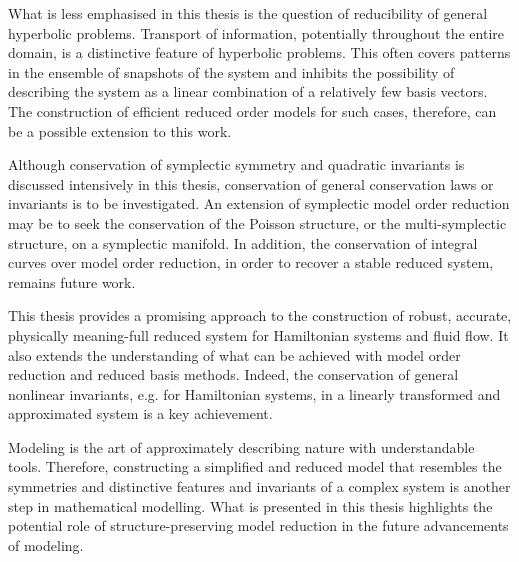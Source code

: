 What is less emphasised in this thesis is the question of reducibility of general hyperbolic problems. Transport of information, potentially throughout the entire domain, is a distinctive feature of hyperbolic problems. This often covers patterns in the ensemble of snapshots of the system and inhibits the possibility of describing the system as a linear combination of a relatively few basis vectors. The construction of efficient reduced order models for such cases, therefore, can be a possible extension to this work.

Although conservation of symplectic symmetry and quadratic invariants is discussed intensively in this thesis, conservation of general conservation laws or invariants is to be investigated. An extension of symplectic model order reduction may be to seek the conservation of the Poisson structure, or the multi-symplectic structure, on a symplectic manifold. In addition, the conservation of integral curves over model order reduction, in order to recover a stable reduced system, remains future work.

This thesis provides a promising approach to the construction of robust, accurate, physically meaning-full reduced system for Hamiltonian systems and fluid flow. It also extends the understanding of what can be achieved with model order reduction and reduced basis methods. Indeed, the conservation of general nonlinear invariants, e.g. for Hamiltonian systems, in a linearly transformed and approximated system is a key achievement. 

Modeling is the art of approximately describing nature with understandable tools. Therefore, constructing a simplified and reduced model that resembles the symmetries and distinctive features and invariants of a complex system is another step in mathematical modelling. What is presented in this thesis highlights the potential role of structure-preserving model reduction in the future advancements of modeling.
